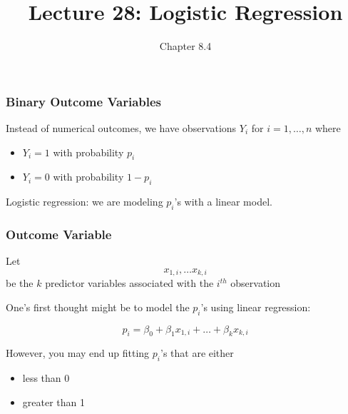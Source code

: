 \documentclass[handout]{beamer}
\title{Lecture 28: Logistic Regression}
\author{Chapter 8.4}
\date{}
\newcommand{\blue}[1]{\textcolor{blue2}{#1}}
\begin{document}
\begin{frame}
\titlepage
\end{frame}


%
%
%
%
%
%
%


\begin{frame}[fragile]
\frametitle{Binary Outcome Variables}

%
%
Instead of numerical outcomes, we have observations $Y_i$ for $i=1,\ldots,n$ where
\begin{itemize}
\item $Y_i=1$ with probability $p_i$
\item $Y_i=0$ with probability $1-p_i$
\end{itemize}

\vspace{0.5cm}
\pause
\blue{Logistic regression}: we are modeling $p_i$'s with a linear model.

\end{frame}


\begin{frame}[fragile]
\frametitle{Outcome Variable}

%
%
Let
\[
x_{1,i}, \ldots x_{k,i}
\]
be the $k$ predictor variables associated with the $i^{th}$ observation

\vspace{0.5cm}
\pause
One's first thought might be to model the $p_i$'s using linear regression:

\[
p_i = \beta_0 + \beta_1 x_{1,i} + \ldots + \beta_k x_{k,i}
\]

\vspace{0.5cm}
\pause
However, you may end up fitting $p_i$'s that are either
\begin{itemize}
\item less than 0
\item greater than 1
\end{itemize}

\end{frame}
\end{document}
